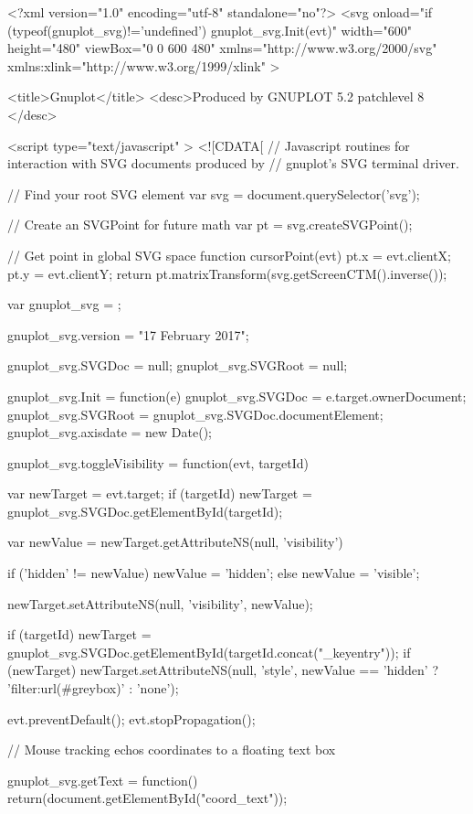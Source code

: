 <?xml version="1.0" encoding="utf-8"  standalone="no"?>
<svg  onload="if (typeof(gnuplot_svg)!='undefined') gnuplot_svg.Init(evt)" 
 width="600" height="480"
 viewBox="0 0 600 480"
 xmlns="http://www.w3.org/2000/svg"
 xmlns:xlink="http://www.w3.org/1999/xlink"
>

<title>Gnuplot</title>
<desc>Produced by GNUPLOT 5.2 patchlevel 8 </desc>

<script type="text/javascript" > <![CDATA[
// Javascript routines for interaction with SVG documents produced by 
// gnuplot's SVG terminal driver.

// Find your root SVG element
var svg = document.querySelector('svg');

// Create an SVGPoint for future math
var pt = svg.createSVGPoint();

// Get point in global SVG space
function cursorPoint(evt){
  pt.x = evt.clientX; pt.y = evt.clientY;
  return pt.matrixTransform(svg.getScreenCTM().inverse());
}

var gnuplot_svg = { };

gnuplot_svg.version = "17 February 2017";

gnuplot_svg.SVGDoc = null;
gnuplot_svg.SVGRoot = null;

gnuplot_svg.Init = function(e)
{
   gnuplot_svg.SVGDoc = e.target.ownerDocument;
   gnuplot_svg.SVGRoot = gnuplot_svg.SVGDoc.documentElement;
   gnuplot_svg.axisdate = new Date();
}

gnuplot_svg.toggleVisibility = function(evt, targetId)
{
   var newTarget = evt.target;
   if (targetId)
      newTarget = gnuplot_svg.SVGDoc.getElementById(targetId);

   var newValue = newTarget.getAttributeNS(null, 'visibility')

   if ('hidden' != newValue)
      newValue = 'hidden';
   else
      newValue = 'visible';

   newTarget.setAttributeNS(null, 'visibility', newValue);

   if (targetId) {
      newTarget = gnuplot_svg.SVGDoc.getElementById(targetId.concat("_keyentry"));
      if (newTarget)
         newTarget.setAttributeNS(null, 'style',
		newValue == 'hidden' ? 'filter:url(#greybox)' : 'none');
   }

   evt.preventDefault();
   evt.stopPropagation();
}

// Mouse tracking echos coordinates to a floating text box

gnuplot_svg.getText = function() {
	return(document.getElementById("coord_text"));
}

